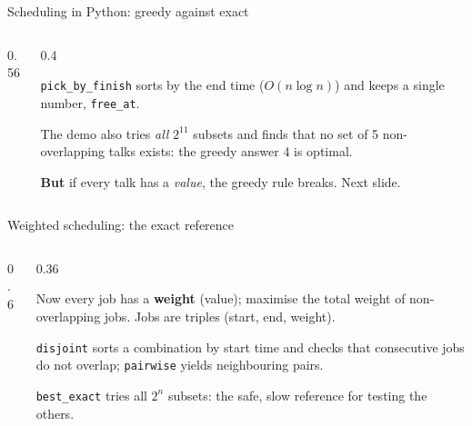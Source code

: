 \documentclass[aspectratio=169,10pt]{beamer}
\begin{document}
\begin{frame}{Scheduling in Python: greedy against exact}
\begin{columns}[T]
\begin{column}{0.56\textwidth}
\vspace{2mm}
\end{column}
\begin{column}{0.4\textwidth}
{\small
\texttt{pick\_by\_finish} sorts by the end time ($O(n\log n)$) and keeps a single number, \texttt{free\_at}.

\vspace{2mm}
The demo also tries \emph{all} $2^{11}$ subsets and finds that no set of 5 non-overlapping talks exists: the greedy answer 4 is optimal.

\vspace{2mm}
\textbf{But} if every talk has a \emph{value}, the greedy rule breaks. Next slide.}
\end{column}
\end{columns}
\end{frame}

\begin{frame}{Weighted scheduling: the exact reference}
\begin{columns}[T]
\begin{column}{0.6\textwidth}
\pycode[\fontsize{7.8}{9.2}\selectfont]{act_exact}
\end{column}
\begin{column}{0.36\textwidth}
{\small
Now every job has a \textbf{weight} (value); maximise the total weight of non-overlapping jobs. Jobs are triples (start, end, weight).

\vspace{2mm}
\texttt{disjoint} sorts a combination by start time and checks that consecutive jobs do not overlap; \texttt{pairwise} yields neighbouring pairs.

\vspace{2mm}
\texttt{best\_exact} tries all $2^n$ subsets: the safe, slow reference for testing the others.}
\end{column}
\end{columns}
\end{frame}
\end{document}
